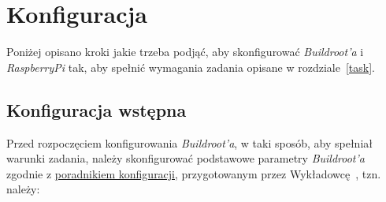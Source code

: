 \documentclass{article}
\begin{document}

\section{Konfiguracja}

Poniżej opisano kroki jakie trzeba podjąć, aby skonfigurować \emph{Buildroot'a} i \emph{RaspberryPi} tak, aby spełnić wymagania zadania opisane w rozdziale~\ref{task}.


\subsection{Konfiguracja wstępna}

Przed rozpoczęciem konfigurowania \emph{Buildroot'a}, w taki sposób, aby spełniał warunki zadania, należy skonfigurować podstawowe parametry \emph{Buildroot'a} zgodnie z \href{http://wzab.cba.pl/LINSW/poradnik\_laboratorium.pdf}{poradnikiem konfiguracji}, przygotowanym przez Wykładowcę~\cite{www:wzab}, tzn. należy:
\end{document}
